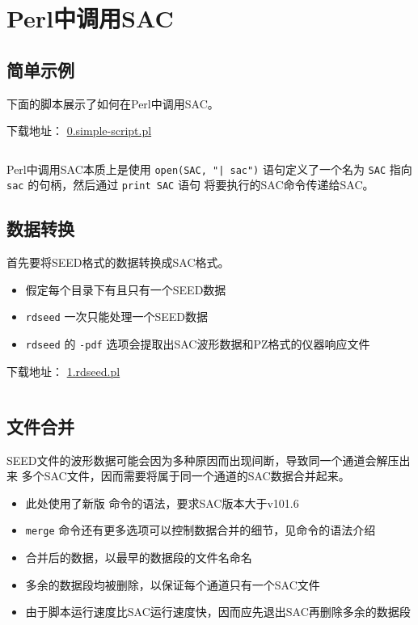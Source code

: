 \section{Perl中调用SAC}
\label{sec:sac-perl}

\subsection{简单示例}
下面的脚本展示了如何在Perl中调用SAC。

下载地址： \href{https://raw.githubusercontent.com/seisman/SAC_Docs_zh/master/call-in-script/0.simple-script.pl}{0.simple-script.pl}
\inputminted{perl}{./call-in-script/0.simple-script.pl}
Perl中调用SAC本质上是使用 \texttt{open(SAC, "| sac")} 语句定义了一个名为
\texttt{SAC} 指向 \texttt{sac} 的句柄，然后通过 \texttt{print SAC} 语句
将要执行的SAC命令传递给SAC。

\subsection{数据转换}
首先要将SEED格式的数据转换成SAC格式。
\begin{itemize}
\item 假定每个目录下有且只有一个SEED数据
\item \texttt{rdseed} 一次只能处理一个SEED数据
\item \texttt{rdseed} 的 \texttt{-pdf} 选项会提取出SAC波形数据和PZ格式的仪器响应文件
\end{itemize}

下载地址： \href{https://raw.githubusercontent.com/seisman/SAC_Docs_zh/master/call-in-script/1.rdseed.pl}{1.rdseed.pl}
\inputminted{perl}{./call-in-script/1.rdseed.pl}

\subsection{文件合并}
\label{subsec:merge-in-perl}
SEED文件的波形数据可能会因为多种原因而出现间断，导致同一个通道会解压出来
多个SAC文件，因而需要将属于同一个通道的SAC数据合并起来。
\begin{itemize}
\item 此处使用了新版  命令的语法，要求SAC版本大于v101.6
\item \texttt{merge} 命令还有更多选项可以控制数据合并的细节，见命令的语法介绍
\item 合并后的数据，以最早的数据段的文件名命名
\item 多余的数据段均被删除，以保证每个通道只有一个SAC文件
\item 由于脚本运行速度比SAC运行速度快，因而应先退出SAC再删除多余的数据段
\end{itemize}

